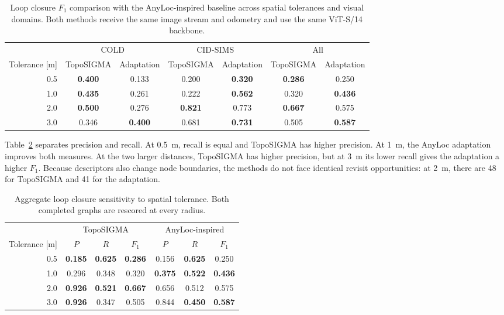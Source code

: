 \documentclass[5p,twocolumn,nonatbib,reversenotenum]{elsarticle}
\newcommand{\methodname}{TopoSIGMA\xspace}
\begin{document}
\begin{table}[t]
\centering
\caption{Loop closure $F_1$ comparison with the AnyLoc-inspired baseline across spatial tolerances and visual domains. Both methods receive the same image stream and odometry and use the same ViT-S/14 backbone.}
\label{tab:baseline}
\small
\setlength{\tabcolsep}{3.5pt}
\begin{tabular}{rcccccc}
\hline
& \multicolumn{2}{c}{COLD} & \multicolumn{2}{c}{CID-SIMS} & \multicolumn{2}{c}{All}\\
Tolerance [m] & \methodname & Adaptation & \methodname & Adaptation & \methodname & Adaptation\\
\hline
0.5 & \textbf{0.400} & 0.133 & 0.200 & \textbf{0.320} & \textbf{0.286} & 0.250\\
1.0 & \textbf{0.435} & 0.261 & 0.222 & \textbf{0.562} & 0.320 & \textbf{0.436}\\
2.0 & \textbf{0.500} & 0.276 & \textbf{0.821} & 0.773 & \textbf{0.667} & 0.575\\
3.0 & 0.346 & \textbf{0.400} & 0.681 & \textbf{0.731} & 0.505 & \textbf{0.587}\\
\hline
\end{tabular}
\end{table}

Table~\ref{tab:tolerance_baseline} separates precision and recall. At \qty{0.5}{\metre}, recall is equal and \methodname has higher precision. At \qty{1}{\metre}, the AnyLoc adaptation improves both measures. At the two larger distances, \methodname has higher precision, but at \qty{3}{\metre} its lower recall gives the adaptation a higher $F_1$. Because descriptors also change node boundaries, the methods do not face identical revisit opportunities: at \qty{2}{\metre}, there are 48 for \methodname and 41 for the adaptation.

\begin{table}[!htbp]
    \centering
    \caption{Aggregate loop closure sensitivity to spatial tolerance. Both completed graphs are rescored at every radius.}
    \label{tab:tolerance_baseline}
    \small
    \setlength{\tabcolsep}{3pt}
    \begin{tabular}{rcccccc}
    \hline
    & \multicolumn{3}{c}{\methodname} & \multicolumn{3}{c}{AnyLoc-inspired}\\
    Tolerance [m] & $P$ & $R$ & $F_1$ & $P$ & $R$ & $F_1$\\
    \hline
    0.5 & \textbf{0.185} & \textbf{0.625} & \textbf{0.286} & 0.156 & \textbf{0.625} & 0.250\\
    1.0 & 0.296 & 0.348 & 0.320 & \textbf{0.375} & \textbf{0.522} & \textbf{0.436}\\
    2.0 & \textbf{0.926} & \textbf{0.521} & \textbf{0.667} & 0.656 & 0.512 & 0.575\\
    3.0 & \textbf{0.926} & 0.347 & 0.505 & 0.844 & \textbf{0.450} & \textbf{0.587}\\
    \hline
    \end{tabular}
\end{table}
\end{document}
